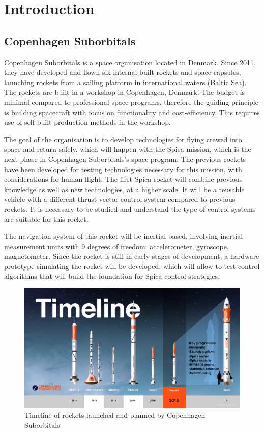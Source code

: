 \chapter{Introduction}
\justify
\noindent

\section{Copenhagen Suborbitals}

Copenhagen Suborbitals is a space organisation located in Denmark. Since 2011, they have developed and flown six internal built rockets and space capsules, launching rockets from a sailing platform in international waters (Baltic Sea). The rockets are built in a workshop in Copenhagen, Denmark. The budget is minimal compared to professional space programs, therefore the guiding principle is building  spacecraft with focus on functionality and cost-efficiency. This requires use of self-built production methods in the workshop.

The goal of the organisation is to develop technologies for flying crewed into space and return safely, which will happen with the Spica mission, which is the next phase in Copenhagen Suborbitals's space program. The previous rockets have been developed for testing technologies necessary for this mission, with considerations for human flight. The first Spica rocket will combine previous knowledge as well as new technologies, at a higher scale. 
It will be a reusable vehicle with a different thrust vector control system compared to previous rockets. It is necessary to be studied and understand the type of control systems are suitable for this rocket. 

The navigation system of this rocket will be inertial based, involving inertial measurement units with 9 degrees of freedom: accelerometer, gyroscope, magnetometer. Since the rocket is still in early stages of development, a hardware prototype simulating the rocket will be developed, which will allow to test control algorithms that will build the foundation for Spica control strategies.  

\begin{figure}[h!]
  \includegraphics[scale=0.9]{graphics/timeline.png}
  \caption{Timeline of rockets launched and planned by Copenhagen Suborbitals}
  \label{timeline}
\end{figure}

